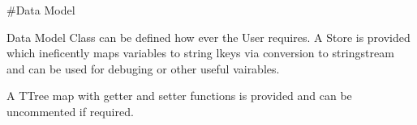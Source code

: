 \#\-Data Model 



Data Model Class can be defined how ever the User requires. A Store is provided which ineficently maps variables to string lkeys via conversion to stringstream and can be used for debuging or other useful vairables.

A T\-Tree map with getter and setter functions is provided and can be uncommented if required. 